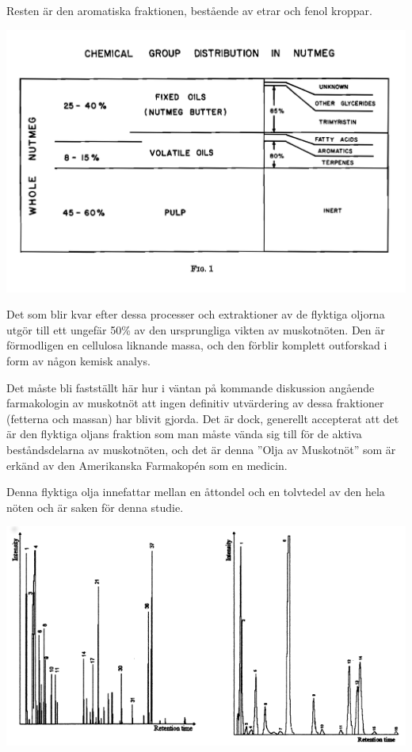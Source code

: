 \documentclass[a4paper,margin=3.25cm]{article}
\begin{document}
Resten är den aromatiska fraktionen, bestående av etrar och fenol kroppar.\cite{shulgin1967chemistry}


\includegraphics[scale=0.103]{Figure1}


Det som blir kvar efter dessa processer och extraktioner av de flyktiga oljorna utgör till ett ungefär 50\% av den ursprungliga vikten av muskotnöten. Den är förmodligen en cellulosa liknande massa, och den förblir komplett outforskad i form av någon kemisk analys.

Det måste bli fastställt här hur i väntan på kommande diskussion angående farmakologin av muskotnöt att ingen definitiv utvärdering av dessa fraktioner (fetterna och massan) har blivit gjorda. Det är dock, generellt accepterat att det är den flyktiga oljans fraktion som man måste vända sig till för de aktiva beståndsdelarna av muskotnöten, och det är denna ''Olja av Muskotnöt'' som är erkänd av den Amerikanska Farmakopén som en medicin.

Denna flyktiga olja innefattar mellan en åttondel och en tolvtedel av den hela nöten och är saken för denna studie.

\hbox{\hspace{-0.1cm}\includegraphics[scale=0.75]{GCgraph}}
\end{document}
